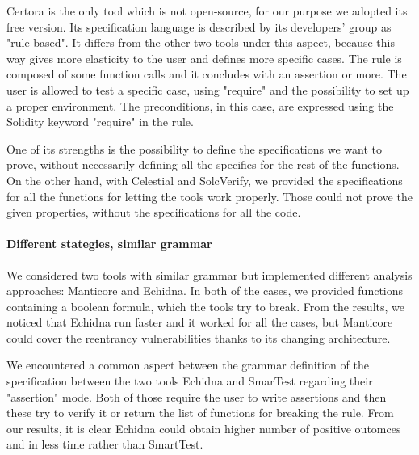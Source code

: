 Certora is the only tool which is not open-source, for our purpose we adopted its free version.
Its specification language is described by its developers' group as "rule-based". It differs from the other two tools under this aspect, because this way gives more elasticity to the user and defines more specific cases.
The rule is composed of some function calls and it concludes with an assertion or more. The user is allowed to test a specific case, using "require" and the possibility to set up a proper environment. 
The preconditions, in this case, are expressed using the Solidity keyword "require" in the rule.

One of its strengths is the possibility to define the specifications we want to prove, without necessarily defining all the specifics for the rest of the functions.
On the other hand,  with Celestial and SolcVerify, we provided the specifications for all the functions for letting the tools work properly. 
Those could not prove the given properties, without the specifications for all the code.


\paragraph{Different stategies, similar grammar}
We considered two tools with similar grammar but implemented different analysis approaches: Manticore and Echidna. 
In both of the cases, we provided functions containing a boolean formula, which the tools try to break. From the results, 
we noticed that Echidna run faster and it worked for all the cases, but Manticore could cover the reentrancy vulnerabilities thanks to its changing architecture.

We encountered a common aspect between the grammar definition of the specification between the two tools Echidna and SmarTest regarding their "assertion" mode. 
Both of those require the user to write assertions and then these try to verify it or return the list of 
functions for breaking the rule. From our results, it is clear Echidna could obtain higher number of positive outomces and in less time rather than SmartTest.
